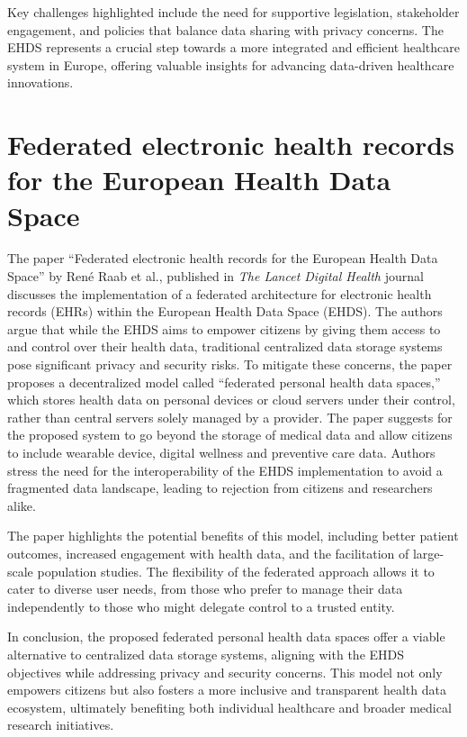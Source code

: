 Key challenges highlighted include the need for supportive legislation, stakeholder engagement, and policies that balance data sharing with privacy concerns.
The EHDS represents a crucial step towards a more integrated and efficient healthcare system in Europe, offering valuable insights for advancing data-driven healthcare innovations.

\section{Federated electronic health records for the European Health Data Space}\label{sec:federated-electronic-health-records-for-the-european-health-data-space}

The paper ``Federated electronic health records for the European Health Data Space'' by René Raab et al., published in \textit{The Lancet Digital Health} journal discusses the implementation of a federated architecture for electronic health records (EHRs) within the European Health Data Space (EHDS)\cite{raab_federated_2023}.
The authors argue that while the EHDS aims to empower citizens by giving them access to and control over their health data, traditional centralized data storage systems pose significant privacy and security risks.
To mitigate these concerns, the paper proposes a decentralized model called ``federated personal health data spaces,'' which stores health data on personal devices or cloud servers under their control, rather than central servers solely managed by a provider.
The paper suggests for the proposed system to go beyond the storage of medical data and allow citizens to include wearable device, digital wellness and preventive care data.
Authors stress the need for the interoperability of the EHDS implementation to avoid a fragmented data landscape, leading to rejection from citizens and researchers alike.

The paper highlights the potential benefits of this model, including better patient outcomes, increased engagement with health data, and the facilitation of large-scale population studies.
The flexibility of the federated approach allows it to cater to diverse user needs, from those who prefer to manage their data independently to those who might delegate control to a trusted entity.

In conclusion, the proposed federated personal health data spaces offer a viable alternative to centralized data storage systems, aligning with the EHDS objectives while addressing privacy and security concerns.
This model not only empowers citizens but also fosters a more inclusive and transparent health data ecosystem, ultimately benefiting both individual healthcare and broader medical research initiatives.

